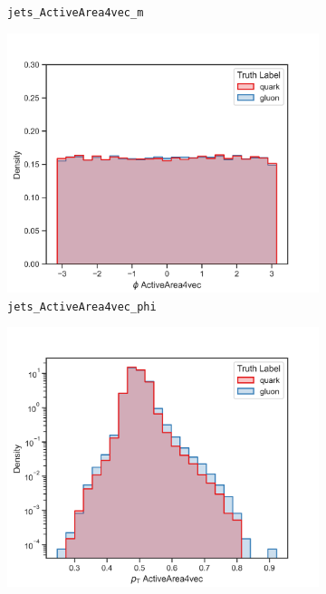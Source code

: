 \begin{figure}[!htb]
\begin{subfigure}[t]{0.49\textwidth}
		\caption{\texttt{jets\_ActiveArea4vec\_m}}
		\label{fig:highlevel_1}
	\end{subfigure}
	\begin{subfigure}[t]{0.49\textwidth}
		\includegraphics[width=1\textwidth]{src/plots/distributions/highlevel/jets_ActiveArea4vec_phi.png}
		\caption{\texttt{jets\_ActiveArea4vec\_phi}}
		\label{fig:highlevel_2}
	\end{subfigure}
	\begin{subfigure}[t]{0.49\textwidth}
		\includegraphics[width=1\textwidth]{src/plots/distributions/highlevel/jets_ActiveArea4vec_pt.png}

\end{subfigure}
\end{figure}
